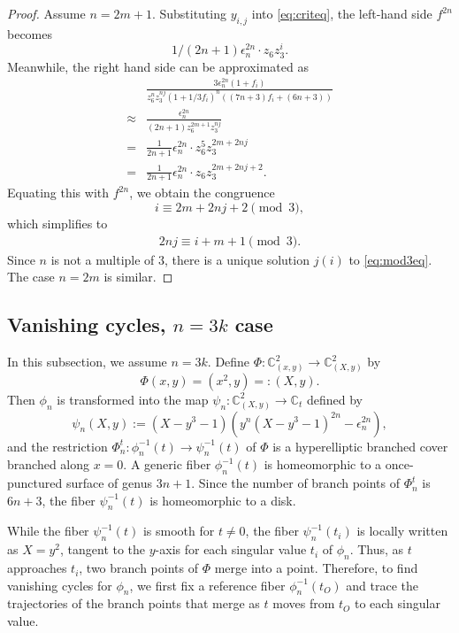 \documentclass[10pt,a4paper,reqno]{amsart}
\theoremstyle{definition}
\numberwithin{equation}{section}
\numberwithin{figure}{section}
\newcommand{\C}{\mathbb{C}}
\newcommand{\ep}{\epsilon}
\newcommand{\arrowr}{\rightarrow}
\begin{document}
\begin{proof}
Assume $n=2m+1$.
Substituting $y_{i,j}$ into \eqref{eq:criteq}, the left-hand side $f^{2n}$ becomes 
\[1/(2n+1){\ep_n^{2n}} \cdot z_6 z_3 ^{i}.\]
Meanwhile, the right hand side can be approximated as
\begin{align*}
&\frac{3 {\ep_n^{2n}} (1+ f_i)}{z_6^n z_3^{nj} (1+1/3 f_i)^n ((7n+3)f_i +(6n+3))} \\
\approx& \frac{{\ep_n^{2n}}}{(2n+1) z_6^{2m+1} z_3^{nj}} \\
=&\frac{1}{2n+1} {\ep_n^{2n}} \cdot z_6^5 z_3^{2m+2nj} \\
=&\frac{1}{2n+1} {\ep_n^{2n}} \cdot z_6 z_3^{2m+2nj+2}.
\end{align*}
Equating this with $f^{2n}$, we obtain the congruence
\[i \equiv 2m+2nj+2 \pmod 3,\]
which simplifies to
\begin{align} \label{eq:mod3eq}
2nj \equiv i+m+1 \pmod 3.
\end{align}
Since $n$ is not a multiple of $3$, there is a unique solution $j(i)$ to \eqref{eq:mod3eq}.
The case $n=2m$ is similar.
\end{proof}



\subsection{Vanishing cycles, $n=3k$ case} \label{sec:vc_3k}
In this subsection, we assume $n=3k$. 
Define $\Phi:\C_{(x,y)}^2 \arrowr \C_{(X,y)}^2$ by 
\[\Phi(x,y)=(x^2,y)=:(X,y).\]
Then $\phi_n$ is transformed into the map $\psi_n: \C^2_{(X,y)} \arrowr \C_t$ defined by
\[\psi_n(X,y):=(X-y^3-1)(y^n(X-y^3-1)^{2n}-{\ep_n^{2n}}),\]
and the restriction $\Phi_n^t: \phi_n^{-1}(t) \arrowr \psi_n^{-1}(t)$ of $\Phi$ is a hyperelliptic branched cover branched along $x=0$.
A generic fiber $\phi_n^{-1}(t)$ is homeomorphic to a once-punctured surface of genus $3n+1$.
Since the number of branch points of $\Phi_n^t$ is $6n+3$, the fiber $\psi_n^{-1}(t)$ is homeomorphic to a disk.

While the fiber $\psi_n^{-1}(t)$ is smooth for $t\neq 0$, 
the fiber $\psi_n^{-1}(t_{i})$ is locally written as $X=y^2$, tangent to the $y$-axis for each singular value $t_{i}$ of $\phi_n$.
Thus, as $t$ approaches $t_{i}$, two branch points of $\Phi$ merge into a point.
Therefore, to find vanishing cycles for $\phi_n$, we first fix a reference fiber $\phi_n^{-1}(t_O)$ and trace the trajectories of the branch points that merge as $t$ moves from $t_O$ to each singular value.
\end{document}
